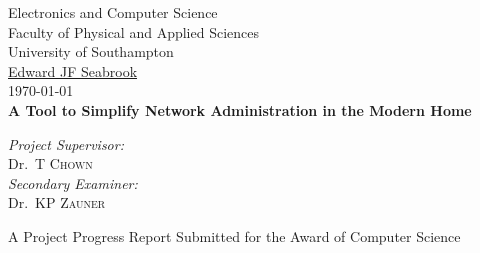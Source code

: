 
\begin{titlepage}

\begin{center}



\LARGE Electronics and Computer Science\\
Faculty of Physical and Applied Sciences\\
University of Southampton
\\[1.5cm]

\href{mailto:ejfs1g10@ecs.soton.ac.uk}{Edward JF Seabrook}\\[0.5cm]

\today \\[1cm]
{\bfseries A Tool to Simplify Network Administration in the Modern Home}\\[1.5cm]

\vfill

\large
\emph{Project Supervisor:} \\
Dr.~T \textsc{Chown}\\[1cm]

\large
\emph{Secondary Examiner:}\\
Dr.~KP \textsc{Zauner} 

\vfill

A Project Progress Report Submitted for the Award of Computer Science

\end{center}

\end{titlepage}
